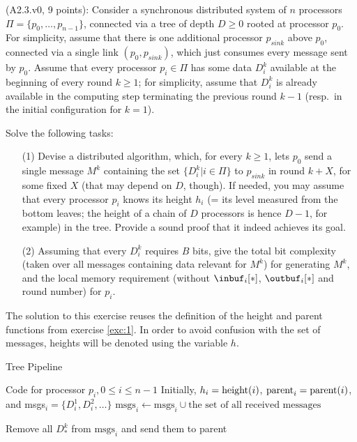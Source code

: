 
\begin{Exc}{(A2.3.v0, 9 points):}
Consider a synchronous distributed system of $n$ processors
$\Pi=\{p_0,\dots,p_{n-1}\}$, connected via a tree of depth $D\geq0$
rooted at processor $p_0$. For simplicity, assume that there is
one additional processor $p_{sink}$ above $p_0$, connected via a single link
$(p_0,p_{sink})$, which just consumes every message sent by $p_0$.
Assume that every processor $p_i\in\Pi$ has
some data $D_i^k$ available at the beginning of every round $k\geq 1$;
for simplicity, assume that $D_i^k$ is already available in the
computing step terminating the previous round $k-1$ (resp.\
in the initial configuration for $k=1$).

Solve the following tasks:
\begin{enumerate}
\item[(1)] Devise a distributed algorithm, which, for every $k\geq 1$,
lets $p_0$ send a single message $M^k$ containing the set
$\{D_i^k| i\in\Pi\}$ to $p_{sink}$ in
round $k+X$, for some fixed $X$ (that may depend on $D$, though).
If needed, you may assume that every processor $p_i$ knows its
height $h_i$ (= its level measured from the bottom leaves;
the height of a chain of $D$ processors is hence $D-1$, for example) in
the tree. Provide a sound proof that it indeed achieves its
goal.

\item[(2)] Assuming that every $D_i^k$ requires $B$ bits,
give the total bit
complexity (taken over all messages containing data relevant for
$M^k$) for generating $M^k$, and the local memory requirement
(without $\inbuf_i[*]$, $\outbuf_i[*]$ and round number) for $p_i$.
\end{enumerate}
\end{Exc}

The solution to this exercise reuses the definition of the height and parent functions
from exercise \ref{exc:1}. In order to avoid confusion with the set of messages,
heights will be denoted using the variable $h$.

\begin{algorithm}
\caption{Tree Pipeline} \label{alg:tpipe}
\begin{algorithmic}[1]
\Statex Code for processor $p_i, 0 \leq i \leq n - 1$
\Statex Initially, $h_i = \text{height}(i)$, $\text{parent}_i = \text{parent}(i)$,
       and msgs$_i = \{ D_i^1, D_i^2, \ldots \}$
    \State $\text{msgs}_i \gets \text{msgs}_i \cup \text{the set of all received messages}$

         \label{line:if}
        \State Remove all $D_*^k$ from $\text{msgs}_i$ and send them to parent \label{line:send}
    \EndIf
\EndFor
\end{algorithmic}
\end{algorithm}

